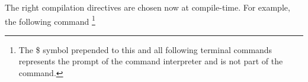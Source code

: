 The right compilation directives are chosen now at compile-time. For example, the following command
\footnote{The \textsf{\$} symbol prepended to this and all following terminal commands represents the prompt of the command interpreter and is not part of the command.}

%
%
%
%
%
%
%
%


